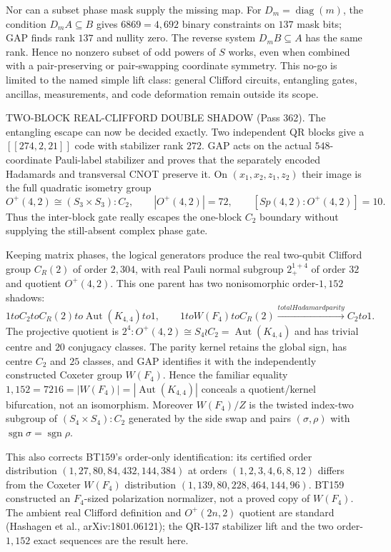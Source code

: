 \documentclass[12pt,a4paper]{article}
\def\mathbb#1{#1}%
\def\textbf#1{#1}%
\def\text#1{#1}%
\def\cdot{ }%
\def\to{ to }%
\theoremstyle{definition}
\begin{document}
\begin{center}
{{Nor can a subset phase mask supply the missing map.  For
$D_m=\operatorname{diag}(m)$, the condition $D_mA\subseteq B$ gives
$68\cdot69=4{,}692$ binary constraints on $137$ mask bits; GAP finds rank
$137$ and nullity zero.  The reverse system $D_mB\subseteq A$ has the same
rank.  Hence no nonzero subset of odd powers of $S$ works, even when combined
with a pair-preserving or pair-swapping coordinate symmetry.  This no-go is
limited to the named simple lift class: general Clifford circuits, entangling
gates, ancillas, measurements, and code deformation remain outside its scope.

\smallskip
\textbf{TWO-BLOCK REAL-CLIFFORD DOUBLE SHADOW (Pass 362).}  The entangling
escape can now be decided exactly.  Two independent QR blocks give a
$[[274,2,21]]$ code with stabilizer rank $272$.  GAP acts on the actual
$548$-coordinate Pauli-label stabilizer and proves that the separately encoded
Hadamards and transversal CNOT preserve it.  On
$(x_1,x_2,z_1,z_2)$ their image is the full quadratic isometry group
\[
 O^+(4,2)\cong(S_3\times S_3):C_2,
 \qquad |O^+(4,2)|=72,
 \qquad [Sp(4,2):O^+(4,2)]=10.
\]
Thus the inter-block gate really escapes the one-block $C_2$ boundary without
supplying the still-absent complex phase gate.

Keeping matrix phases, the logical generators produce the real two-qubit
Clifford group $C_{\mathbb R}(2)$ of order $2{,}304$, with real Pauli normal
subgroup $2^{1+4}_+$ of order $32$ and quotient $O^+(4,2)$.  This one parent
has two nonisomorphic order-$1{,}152$ shadows:
\[
 1\to C_2\to C_{\mathbb R}(2)
   \to\operatorname{Aut}(K_{4,4})\to1,
 \qquad
 1\to W(F_4)\to C_{\mathbb R}(2)
   \xrightarrow{\text{total Hadamard parity}}C_2\to1.
\]
The projective quotient is
$2^4:O^+(4,2)\cong S_4\wr C_2=\operatorname{Aut}(K_{4,4})$ and has trivial
centre and $20$ conjugacy classes.  The parity kernel retains the global sign,
has centre $C_2$ and $25$ classes, and GAP identifies it with the independently
constructed Coxeter group $W(F_4)$.  Hence the familiar equality
$1{,}152=72\cdot16=|W(F_4)|=|\operatorname{Aut}(K_{4,4})|$ conceals a
quotient/kernel bifurcation, not an isomorphism.  Moreover $W(F_4)/Z$ is the
twisted index-two subgroup of $(S_4\times S_4):C_2$ generated by the side swap
and pairs $(\sigma,\rho)$ with
$\operatorname{sgn}\sigma=\operatorname{sgn}\rho$.

This also corrects BT159's order-only identification: its certified
order distribution
$(1,27,80,84,432,144,384)$ at orders
$(1,2,3,4,6,8,12)$ differs from the Coxeter $W(F_4)$ distribution
$(1,139,80,228,464,144,96)$.  BT159 constructed an $F_4$-sized
polarization normalizer, not a proved copy of $W(F_4)$.  The ambient real
Clifford definition and $O^+(2n,2)$ quotient are standard
(Hashagen et al., arXiv:1801.06121); the QR-137 stabilizer lift and the two
order-$1{,}152$ exact sequences are the result here.

}}
\end{center}
\end{document}
